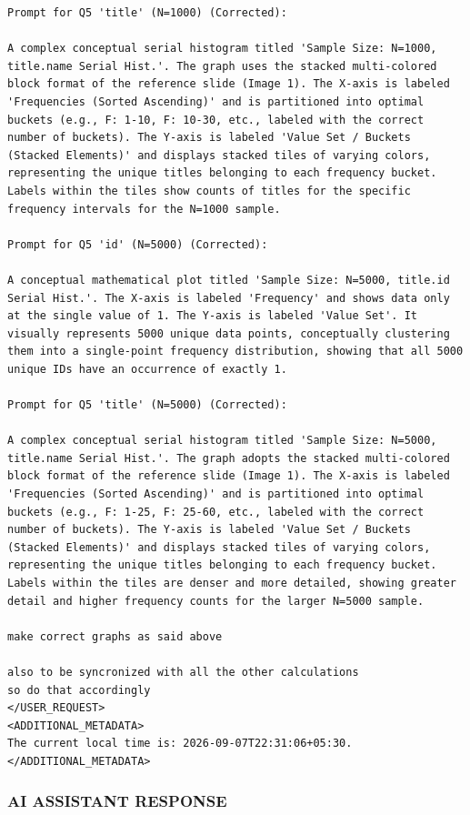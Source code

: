 \documentclass[11pt,a4paper]{article}
\begin{document}
\begin{lstlisting}[language=text]
Prompt for Q5 'title' (N=1000) (Corrected):

A complex conceptual serial histogram titled 'Sample Size: N=1000, title.name Serial Hist.'. The graph uses the stacked multi-colored block format of the reference slide (Image 1). The X-axis is labeled 'Frequencies (Sorted Ascending)' and is partitioned into optimal buckets (e.g., F: 1-10, F: 10-30, etc., labeled with the correct number of buckets). The Y-axis is labeled 'Value Set / Buckets (Stacked Elements)' and displays stacked tiles of varying colors, representing the unique titles belonging to each frequency bucket. Labels within the tiles show counts of titles for the specific frequency intervals for the N=1000 sample.

Prompt for Q5 'id' (N=5000) (Corrected):

A conceptual mathematical plot titled 'Sample Size: N=5000, title.id Serial Hist.'. The X-axis is labeled 'Frequency' and shows data only at the single value of 1. The Y-axis is labeled 'Value Set'. It visually represents 5000 unique data points, conceptually clustering them into a single-point frequency distribution, showing that all 5000 unique IDs have an occurrence of exactly 1.

Prompt for Q5 'title' (N=5000) (Corrected):

A complex conceptual serial histogram titled 'Sample Size: N=5000, title.name Serial Hist.'. The graph adopts the stacked multi-colored block format of the reference slide (Image 1). The X-axis is labeled 'Frequencies (Sorted Ascending)' and is partitioned into optimal buckets (e.g., F: 1-25, F: 25-60, etc., labeled with the correct number of buckets). The Y-axis is labeled 'Value Set / Buckets (Stacked Elements)' and displays stacked tiles of varying colors, representing the unique titles belonging to each frequency bucket. Labels within the tiles are denser and more detailed, showing greater detail and higher frequency counts for the larger N=5000 sample.

make correct graphs as said above

also to be syncronized with all the other calculations 
so do that accordingly 
</USER_REQUEST>
<ADDITIONAL_METADATA>
The current local time is: 2026-09-07T22:31:06+05:30.
</ADDITIONAL_METADATA>
\end{lstlisting}


\subsubsection{AI ASSISTANT RESPONSE}
\end{document}
